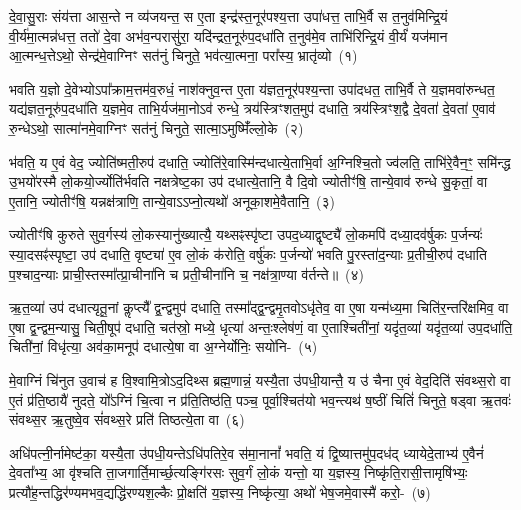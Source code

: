 \setcounter{anuvakam}{0}
दे॒वा॒सु॒राः संय॑त्ता आस॒न्ते न व्य॑जयन्त॒ स ए॒ता इन्द्र॑स्त॒नूर॑पश्य॒त्ता उपा॑धत्त॒ ताभि॒र्वै स त॒नुव॑मिन्द्रि॒यं वी॒र्य॑मा॒त्मन्न॑धत्त॒ ततो॑ दे॒वा अभ॑व॒न्परासु॑रा॒ यदि॑न्द्रत॒नूरु॑प॒\-दधा॑ति त॒नुव॑मे॒व ताभि॑रिन्द्रि॒यं वी॒र्यं॑ यज॑मान आ॒त्मन्ध॒त्ते\-ऽथो॒ सेन्द्र॑मे॒वाग्निꣳ सत॑नुं चिनुते॒ भव॑त्या॒त्मना॒ परा᳚स्य॒ भ्रातृ॑व्यो~(१)\ip

भवति य॒ज्ञो दे॒वेभ्यो\-ऽपा᳚क्राम॒त्तम॑व॒रुधं॒ नाश॑क्नुव॒न्त ए॒ता य॑ज्ञत॒नूर॑पश्य॒न्ता उपा॑दधत॒ ताभि॒र्वै ते य॒ज्ञमवा॑रुन्धत॒ यद्य॑ज्ञत॒नूरु॑प॒\-दधा॑ति य॒ज्ञमे॒व ताभि॒र्यज॑मा॒नो\-ऽव॑ रुन्धे॒ त्रय॑स्त्रिꣳशत॒मुप॑ दधाति॒ त्रय॑स्त्रिꣳश॒द्वै दे॒वता॑ दे॒वता॑ ए॒वाव॑ रु॒न्धे\-ऽथो॒ सात्मा॑नमे॒वाग्निꣳ सत॑नुं चिनुते॒ सात्मा॒\-ऽमुष्मिँ॑ल्लो॒के~(२)\ip

भ॑वति॒ य ए॒वं वेद॒ ज्योति॑ष्मती॒रुप॑ दधाति॒ ज्योति॑रे॒वास्मि॑न्दधात्ये॒ताभि॒र्वा अ॒ग्निश्चि॒तो ज्व॑लति॒ ताभि॑रे॒वैन॒ꣳ॒ समि॑न्द्ध उ॒भयो॑रस्मै लो॒कयो॒र्ज्योति॑र्भवति नक्षत्रेष्ट॒का उप॑ दधात्ये॒तानि॒ वै दि॒वो ज्योतीꣳ॑षि॒ तान्ये॒वाव॑ रुन्धे सु॒कृतां॒ वा ए॒तानि॒ ज्योतीꣳ॑षि॒ यन्नक्ष॑त्राणि॒ तान्ये॒वा\-ऽऽ\-प्नो॒त्यथो॑ अनूका॒शमे॒वैतानि॒~(३)\ip

ज्योतीꣳ॑षि कुरुते सुव॒र्गस्य॑ लो॒कस्यानु॑ख्यात्यै॒ यथ्सꣴस्पृ॑ष्टा उपद॒ध्याद्वृष्ट्यै॑ लो॒कमपि॑ दध्या॒दव॑र्\mbox{}षुकः प॒र्जन्यः॑ स्या॒दसꣴ॑स्पृष्टा॒ उप॑ दधाति॒ वृष्ट्या॑ ए॒व लो॒कं क॑रोति॒ वर्\mbox{}षु॑कः प॒र्जन्यो॑ भवति पु॒रस्ता॑द॒न्याः प्र॒तीची॒रुप॑ दधाति प॒श्चाद॒न्याः प्राची॒स्तस्मा᳚त्प्रा॒चीना॑नि च प्रती॒चीना॑नि च॒ नक्ष॑त्रा॒ण्या व॑र्तन्ते॥~(४)\ip

{\anuvakamend[{भ्रातृ॑व्यो लो॒क ए॒वैतान्येक॑चत्वारिꣳशच्च}]}

ऋ॒त॒व्या॑ उप॑ दधात्यृतू॒नां कॢप्त्यै᳚ द्व॒न्द्वमुप॑ दधाति॒ तस्मा᳚द्\-द्व॒न्द्वमृ॒तवो\-ऽधृ॑तेव॒ वा ए॒षा यन्म॑ध्य॒मा चिति॑र॒न्तरि॑क्षमिव॒ वा ए॒षा द्व॒न्द्वम॒न्यासु॒ चिती॒षूप॑ दधाति॒ चत॑स्रो॒ मध्ये॒ धृत्या॑ अन्तः॒श्लेष॑णं॒ वा ए॒ताश्चिती॑नां॒ यदृ॑त॒व्या॑ यदृ॑त॒व्या॑ उप॒\-दधा॑ति॒ चिती॑नां॒ विधृ॑त्या॒ अव॑का॒मनूप॑ दधात्ये॒षा वा अ॒ग्नेर्योनिः॒ सयो॑नि-~(५)\ip

मे॒वाग्निं चि॑नुत उ॒वाच॑ ह वि॒श्वामि॒त्रो\-ऽद॒दिथ्स ब्रह्म॒णान्नं॒ यस्यै॒ता उ॑पधी॒यान्तै॒ य उ॑ चैना ए॒वं वेद॒दिति॑ संवथ्स॒रो वा ए॒तं प्र॑ति॒ष्ठायै॑ नुदते॒ यो᳚\-ऽग्निं चि॒त्वा न प्र॑ति॒तिष्ठ॑ति॒ पञ्च॒ पूर्वा॒श्चित॑यो भव॒न्त्यथ॑ ष॒ष्ठीं चितिं॑ चिनुते॒ षड्वा ऋ॒तवः॑ संवथ्स॒र ऋ॒तुष्वे॒व सं॑वथ्स॒रे प्रति॑ तिष्ठत्ये॒ता वा~(६)\ip

अधि॑पत्नी॒र्नामेष्ट॑का॒ यस्यै॒ता उ॑पधी॒यन्ते\-ऽधि॑\-पतिरे॒व स॑मा॒नानां᳚ भवति॒ यं द्वि॒ष्यात्तमु॑प॒दध॑द् ध्यायेदे॒ताभ्य॑ ए॒वैनं॑ दे॒वता᳚भ्य॒ आ वृ॑श्चति ता॒जगार्ति॒मार्च्छ॒त्यङ्गि॑रसः सुव॒र्गं लो॒कं यन्तो॒ या य॒ज्ञस्य॒ निष्कृ॑ति॒रासी॒त्तामृषि॑भ्यः॒ प्रत्यौ॑ह॒न्तद्धिर॑ण्यमभव॒द्यद्धि॑रण्यश॒ल्कैः प्रो॒क्षति॑ य॒ज्ञस्य॒ निष्कृ॑त्या॒ अथो॑ भेष॒जमे॒वास्मै॑ करो॒-~(७)\ip

